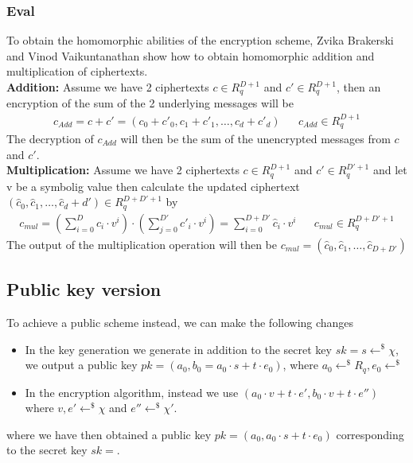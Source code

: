 \documentclass[../main.tex]{subfiles}
\begin{document}
    \subsubsection{Eval}
    To obtain the homomorphic abilities of the encryption scheme, Zvika Brakerski and Vinod Vaikuntanathan show
    how to obtain homomorphic addition and multiplication of ciphertexts.
    \\[2mm]
    \textbf{Addition:} Assume we have 2 ciphertexts $c \in R_q^{D+1}$ and $c' \in R_q^{D+1}$, then an encryption
    of the sum of the 2 underlying messages will be
    \begin{align*}
        c_{Add} = c + c' = (c_0 + c'_0, c_1 + c'_1, \dots , c_d + c'_d) && c_{Add} \in R_q^{D + 1}
    \end{align*}
    The decryption of $c_{Add}$ will then be the sum of the unencrypted messages from $c$ and $c'$.
    \\[2mm]
    \textbf{Multiplication:} Assume we have 2 ciphertexts $c \in R_q^{D+1}$ and $c' \in R_q^{D'+1}$ and let v be a symbolig value
    then calculate the updated ciphertext
    \\
    $(\hat{c}_0, \hat{c}_1, \dots, \hat{c}_d+d') \in R_q^{D + D' + 1}$ by
    \begin{align*}
        c_{mul} = (\sum_{i=0}^D c_i \cdot v^i) \cdot
                  (\sum_{j=0}^{D'} c'_i \cdot v^i) =
                   \sum_{i=0}^{D+D'} \hat{c}_i \cdot v^i
            && c_{mul} \in R_q^{D+D'+1}
    \end{align*}
    The output of the multiplication operation will then be $c_{mul} = (\hat{c}_0, \hat{c}_1, \dots, \hat{c}_{D+D'})$
    
    \subsection{Public key version}
	To achieve a public scheme instead, we can make the following changes
	\begin{itemize}
		\item In the key generation we generate in addition to the secret key $sk = s \leftarrow^{\$} \chi$, we output a public key
		        $pk = (a_0 , b_0 = a_0 \cdot s + t \cdot e_0)$, where $a_0 \leftarrow^{\$} R_q, e_0 \leftarrow^{\$}$
        \item In the encryption algorithm, instead we use 
        $(a_0 \cdot v + t \cdot e', b_0 \cdot v + t \cdot e'')$ where
        $v, e' \leftarrow^{\$} \chi$ and $e'' \leftarrow^{\$} \chi '$.
	\end{itemize}
    where we have then obtained a public key $pk = (a_0, a_0 \cdot s + t \cdot e_0)$
    corresponding to the secret key $sk = $.
    
\end{document}
